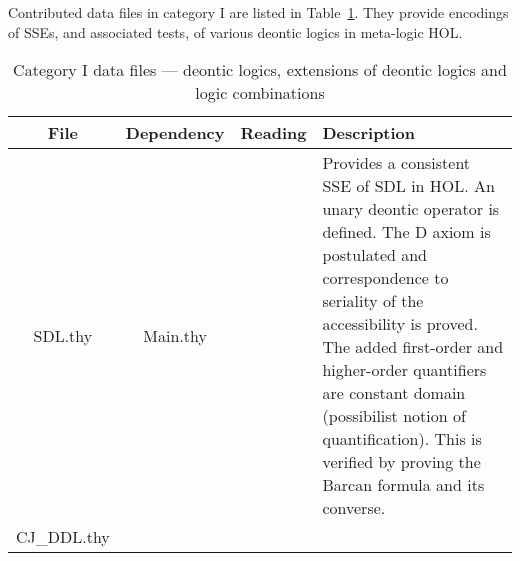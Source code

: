 \documentclass{article}
\begin{document}

Contributed data files in category I are listed in
Table~\ref{table:DeonticLogics}. They provide encodings of SSEs, and
associated tests, of various deontic logics in meta-logic HOL.

\setcounter{table}{0}
\begin{table}[ht!]
\caption{Category I data files --- deontic logics, extensions of
  deontic logics and logic combinations \label{table:DeonticLogics}}
\begin{tabularx}{\textwidth}{ccc*{1}{>{\raggedright\arraybackslash}X}}
  \toprule
  File & Dependency & Reading & Description \\
  \midrule
  \textsf{\small SDL.thy} 
       & \textsf{\small Main.thy} 
                    & \cite{J23,ddl:C80}  
                              & %
                                Provides a consistent SSE of SDL in
                                HOL. An unary deontic operator is
                                defined.
                                The D axiom is postulated and correspondence to seriality of the
                                accessibility is proved. The added
                                first-order and higher-order
                                quantifiers are constant domain
                                (possibilist notion of quantification). This is verified by proving
                                the Barcan formula and its converse. \\
  \midrule
  \textsf{\small CJ_DDL.thy} 

\end{tabularx}
\end{table}
\end{document}

